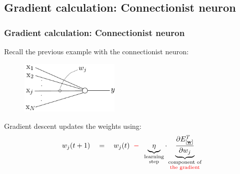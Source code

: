 \subsection{Gradient calculation: Connectionist neuron}

\begin{frame}\frametitle{Gradient calculation: Connectionist neuron}
    
    Recall the previous example with the connectionist neuron:
    
    \begin{figure}[h]
        \centering
        \includegraphics[height=2.5cm]{img/linearNeuron_y}
        \label{fig:neuron} 
    \end{figure}
    
    Gradient descent updates the weights using:
    \begin{equation}
    		w_{j}(t+1) \quad=\quad w_{j}(t) 
				\;\;{\color{red}-}\;\;
				\underbrace{{\eta}}_{ 
						\substack{\text{learning} \\ \text{step} } }
                        \cdot
				\underbrace{\frac{\partial {E}^T_{[\underline{\mathbf{w}}]}}{
					\partial {w}_{j}}}_{
						\substack{
							\text{component of}\\
							\text{\textcolor{red}{the gradient}} 
			} }
    \end{equation}
    
\end{frame}
